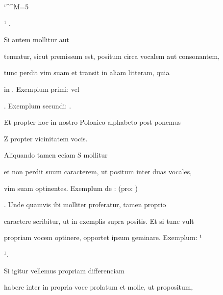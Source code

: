 \splitlines

\catcode `\^^M=5
\obeylines

¹   .

\indentK Si autem mollitur aut

\fulllines
tenuatur, sicut premissum est, positum circa vocalem aut consonantem,

tunc perdit vim suam et transit in aliam litteram, quia

in . Exemplum primi:  vel  

 . Exemplum secundi:   .

Et propter hoc in nostro Polonico alphabeto post  ponemus

\splitlines

Z propter vicinitatem vocis.

\indentK Aliquando tamen eciam S mollitur

\fulllines

et non perdit suum caracterem, ut positum inter duas vocales,

vim suam optinentes. Exemplum de :   (pro: ) 

. Unde quamvis ibi molliter proferatur, tamen proprio

caractere scribitur, ut in exemplis supra positis. Et si tunc vult

propriam vocem optinere, opportet ipsum geminare. Exemplum: ¹

\newpage
\splitlines

 ¹.

\indentK Si igitur vellemus propriam differenciam

\fulllines

habere inter  in propria voce prolatum et  molle, ut propositum,





